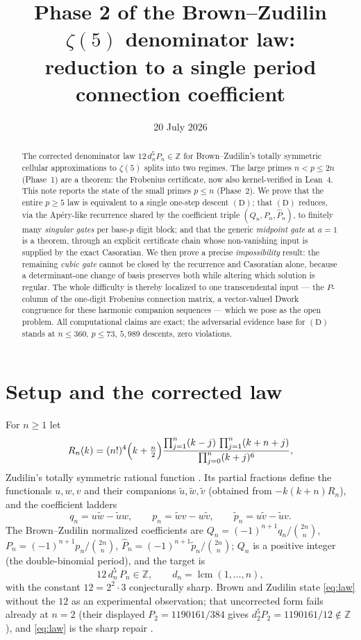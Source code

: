 \documentclass[11pt]{article}
\title{Phase 2 of the Brown--Zudilin $\zeta(5)$ denominator law:\\
reduction to a single period connection coefficient}
\author{}
\date{20 July 2026}
\theoremstyle{definition}
\DeclareMathOperator{\lcm}{lcm}
\newcommand{\Z}{\mathbb{Z}}
\newcommand{\bin}[2]{\binom{#1}{#2}}
\newcommand{\Ph}{\widehat{P}}
\begin{document}
\maketitle

\begin{abstract}
The corrected denominator law $12\,d_n^5 P_n \in \Z$ for Brown--Zudilin's
totally symmetric cellular approximations to $\zeta(5)$ splits into two
regimes. The large primes $n < p \le 2n$ (Phase~1) are a theorem: the
Frobenius certificate, now also kernel-verified in Lean~4. This note reports
the state of the small primes $p \le n$ (Phase~2). We prove that the entire
$p \ge 5$ law is equivalent to a single one-step descent $(\mathrm D)$;
that $(\mathrm D)$ reduces, via the Ap\'ery-like recurrence shared by the
coefficient triple $(Q_n, P_n, \Ph_n)$, to finitely many
\emph{singular gates} per base-$p$ digit block; and that the generic
\emph{midpoint gate} at $a = 1$ is a theorem, through an explicit certificate
chain whose non-vanishing input is supplied by the exact Casoratian. We then
prove a precise \emph{impossibility} result: the remaining \emph{cubic gate}
cannot be closed by the recurrence and Casoratian alone, because a
determinant-one change of basis preserves both while altering which solution
is regular. The whole difficulty is thereby localized to one transcendental
input --- the $P$-column of the one-digit Frobenius connection matrix, a
vector-valued Dwork congruence for these harmonic companion sequences ---
which we pose as the open problem. All computational claims are exact; the
adversarial evidence base for $(\mathrm D)$ stands at $n \le 360$, $p \le 73$,
$5{,}989$ descents, zero violations.
\end{abstract}

\section{Setup and the corrected law}

For $n \ge 1$ let
\[
R_n(k) = (n!)^4\Bigl(k+\tfrac n2\Bigr)
\frac{\prod_{j=1}^n (k-j)\,\prod_{j=1}^n(k+n+j)}{\prod_{j=0}^n(k+j)^6},
\]
Zudilin's totally symmetric rational function \cite{Zu02}. Its partial
fractions define the functionals $u,w,v$ and their companions $\widetilde u,
\widetilde w, \widetilde v$ (obtained from $-k(k+n)R_n$), and the coefficient
ladders
\[
q_n = u\widetilde w - \widetilde u w, \qquad
p_n = \widetilde w v - w\widetilde v, \qquad
\widetilde p_n = u\widetilde v - \widetilde u v.
\]
The Brown--Zudilin normalized coefficients are $Q_n = (-1)^{n+1}q_n/\bin{2n}n$,
$P_n = (-1)^{n+1}p_n/\bin{2n}n$, $\Ph_n = (-1)^{n+1}\widetilde p_n/\bin{2n}n$;
$Q_n$ is a positive integer (the double-binomial period), and the target is
\begin{equation}\label{eq:law}
12\, d_n^5\, P_n \in \Z, \qquad d_n = \lcm(1,\dots,n),
\end{equation}
with the constant $12 = 2^2\cdot 3$ conjecturally sharp. Brown and Zudilin
state \eqref{eq:law} without the $12$ as an experimental observation; that
uncorrected form fails already at $n=2$ (their displayed $P_2 = 1190161/384$
gives $d_2^5 P_2 = 1190161/12 \notin \Z$), and \eqref{eq:law} is the sharp
repair \cite{cbcert,errata}.
\end{document}
